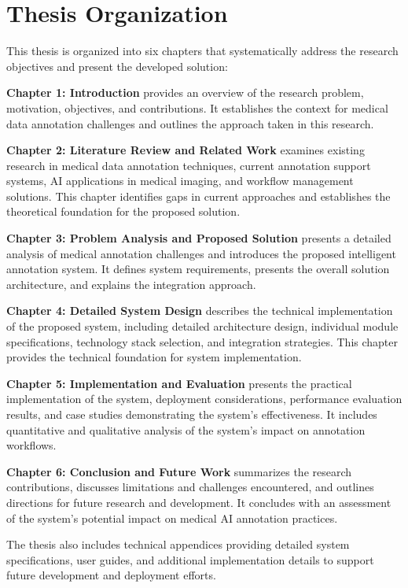 \section{Thesis Organization}

This thesis is organized into six chapters that systematically address the research objectives and present the developed solution:

\textbf{Chapter 1: Introduction} provides an overview of the research problem, motivation, objectives, and contributions. It establishes the context for medical data annotation challenges and outlines the approach taken in this research.

\textbf{Chapter 2: Literature Review and Related Work} examines existing research in medical data annotation techniques, current annotation support systems, AI applications in medical imaging, and workflow management solutions. This chapter identifies gaps in current approaches and establishes the theoretical foundation for the proposed solution.

\textbf{Chapter 3: Problem Analysis and Proposed Solution} presents a detailed analysis of medical annotation challenges and introduces the proposed intelligent annotation system. It defines system requirements, presents the overall solution architecture, and explains the integration approach.

\textbf{Chapter 4: Detailed System Design} describes the technical implementation of the proposed system, including detailed architecture design, individual module specifications, technology stack selection, and integration strategies. This chapter provides the technical foundation for system implementation.

\textbf{Chapter 5: Implementation and Evaluation} presents the practical implementation of the system, deployment considerations, performance evaluation results, and case studies demonstrating the system's effectiveness. It includes quantitative and qualitative analysis of the system's impact on annotation workflows.

\textbf{Chapter 6: Conclusion and Future Work} summarizes the research contributions, discusses limitations and challenges encountered, and outlines directions for future research and development. It concludes with an assessment of the system's potential impact on medical AI annotation practices.

The thesis also includes technical appendices providing detailed system specifications, user guides, and additional implementation details to support future development and deployment efforts. 